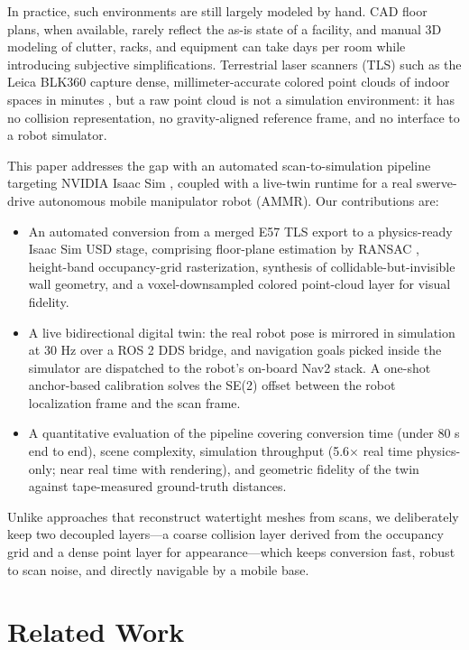 \documentclass[conference]{IEEEtran}
\begin{document}
In practice, such environments are still largely modeled by hand. CAD
floor plans, when available, rarely reflect the as-is state of a
facility, and manual 3D modeling of clutter, racks, and equipment can
take days per room while introducing subjective simplifications.
Terrestrial laser scanners (TLS) such as the Leica BLK360 capture
dense, millimeter-accurate colored point clouds of indoor spaces in
minutes \cite{blk360}, but a raw point cloud is not a simulation
environment: it has no collision representation, no gravity-aligned
reference frame, and no interface to a robot simulator.

This paper addresses the gap with an automated scan-to-simulation
pipeline targeting NVIDIA Isaac Sim \cite{isaacsim}, coupled with a
live-twin runtime for a real swerve-drive autonomous mobile manipulator
robot (AMMR). Our contributions are:
\begin{itemize}
\item An automated conversion from a merged E57 TLS export to a
physics-ready Isaac Sim USD stage, comprising floor-plane estimation by
RANSAC \cite{ransac}, height-band occupancy-grid rasterization,
synthesis of collidable-but-invisible wall geometry, and a
voxel-downsampled colored point-cloud layer for visual fidelity.
\item A live bidirectional digital twin: the real robot pose is
mirrored in simulation at 30 Hz over a ROS 2 \cite{ros2} DDS bridge,
and navigation goals picked inside the simulator are dispatched to the
robot's on-board Nav2 \cite{nav2} stack. A one-shot anchor-based
calibration solves the SE(2) offset between the robot localization
frame and the scan frame.
\item A quantitative evaluation of the pipeline covering conversion
time (under 80 s end to end), scene complexity, simulation throughput
(5.6$\times$ real time physics-only; near real time with rendering),
and geometric fidelity of the twin against tape-measured ground-truth
distances.
\end{itemize}

Unlike approaches that reconstruct watertight meshes from scans, we
deliberately keep two decoupled layers---a coarse collision layer
derived from the occupancy grid and a dense point layer for
appearance---which keeps conversion fast, robust to scan noise, and
directly navigable by a mobile base.

\section{Related Work}
\end{document}
